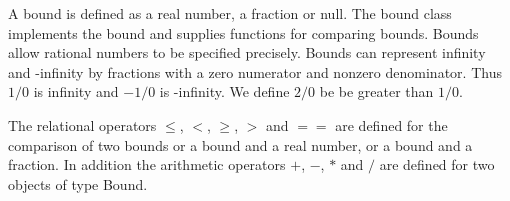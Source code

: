 A bound is defined as a real number, a fraction or null. The bound
class implements the bound and supplies functions for comparing
bounds. Bounds allow rational numbers to be specified precisely.
Bounds can represent infinity and -infinity by fractions with a
zero numerator and nonzero denominator. Thus $1/0$ is infinity
and $-1/0$ is -infinity. We define $2/0$ be be greater than $1/0$.


% 
% 
% 
% 
% 
% 
% 
The relational operators $\le$, $<$, $\ge$, $>$ and $==$ are defined for
the comparison of two bounds or a bound and a real number,
or a bound and a fraction.
In addition the arithmetic operators $+$, $-$, $*$ and $/$ are defined for
two objects of type Bound.
% 